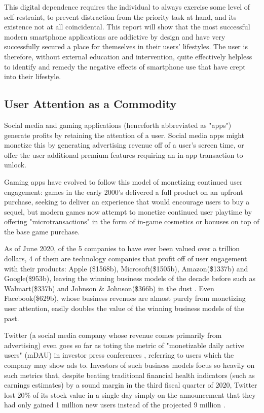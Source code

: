 This digital dependence requires the individual to always exercise some level of self-restraint, to prevent distraction from the priority task at hand, and its existence not at all coincidental. This report will show that the most successful modern smartphone applications are addictive by design and have very successfully secured a place for themselves in their users' lifestyles. The user is therefore, without external education and intervention, quite effectively helpless to identify and remedy the negative effects of smartphone use that have crept into their lifestyle.

\subsection{User Attention as a Commodity}
Social media and gaming applications (henceforth abbreviated as "apps") generate profits by retaining the attention of a user. Social media apps might monetize this by generating advertising revenue off of a user's screen time, or offer the user additional premium features requiring an in-app transaction to unlock.

Gaming apps have evolved to follow this model of monetizing continued user engagement: games in the early 2000's delivered a full product on an upfront purchase, seeking to deliver an experience that would encourage users to buy a sequel, but modern games now attempt to monetize continued user playtime by offering "microtransactions" in the form of in-game cosmetics or bonuses on top of the base game purchase.

As of June 2020, of the 5 companies to have ever been valued over a trillion dollars, 4 of them are technology companies that profit off of user engagement with their products: Apple (\$1568b), Microsoft(\$1505b), Amazon(\$1337b) and Google(\$953b), leaving the winning business models of the decade before such as Walmart(\$337b) and Johnson \& Johnson(\$366b) in the dust \cite{pwctop100}. Even Facebook(\$629b), whose business revenues are almost purely from monetizing user attention, easily doubles the value of the winning business models of the past.

Twitter (a social media company whose revenue comes primarily from advertising) even goes so far as toting the metric of "monetizable daily active users" (mDAU) in investor press conferences \cite{twtrTranscript}, referring to users which the company may show ads to. Investors of such business models focus so heavily on such metrics that, despite beating traditional financial health indicators (such as earnings estimates) by a sound margin in the third fiscal quarter of 2020, Twitter lost 20\% of its stock value in a single day simply on the announcement that they had only gained 1 million new users instead of the projected 9 million \cite{twtrLoss} \cite{twtrTranscript}.

